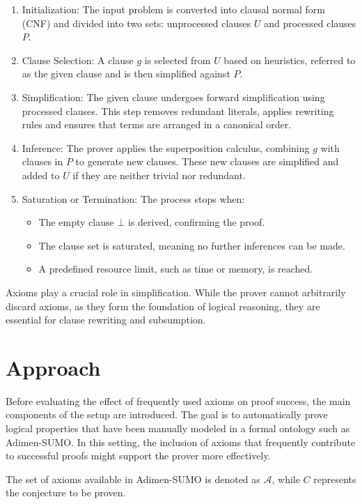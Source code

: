 \documentclass[english,version-2020-11]{uzl-thesis}
\begin{document}
\begin{enumerate}
    \item Initialization: The input problem is converted into clausal normal form (CNF) and divided into two sets: unprocessed clauses \( U \) and processed clauses \( P \).
    \item Clause Selection: A clause \( g \) is selected from \( U \) based on heuristics, referred to as the given clause and is then simplified against \( P \).
    \item Simplification: The given clause undergoes forward simplification using processed clauses. This step removes redundant literals, applies rewriting rules and ensures that terms are arranged in a canonical order.
    \item Inference: The prover applies the superposition calculus, combining \( g \) with clauses in \( P \) to generate new clauses. These new clauses are simplified and added to \( U \) if they are neither trivial nor redundant.
    \newpage
    \item Saturation or Termination: The process stops when:
    \begin{itemize}
        \item The empty clause \( \bot \) is derived, confirming the proof.
        \item The clause set is saturated, meaning no further inferences can be made.
        \item A predefined resource limit, such as time or memory, is reached.
    \end{itemize}
\end{enumerate}

Axioms play a crucial role in simplification. While the prover cannot arbitrarily discard axioms, as they form the foundation of logical reasoning, they are essential for clause rewriting and subsumption.


\section{Approach}

Before evaluating the effect of frequently used axioms on proof success, the main components of the setup are introduced. The goal is to automatically prove logical properties that have been manually modeled in a formal ontology such as Adimen-SUMO. In this setting, the inclusion of axioms that frequently contribute to successful proofs might support the prover more effectively.

The set of axioms available in Adimen-SUMO is denoted as \( \mathcal{A} \), while \( C \) represents the conjecture to be proven.
\end{document}
